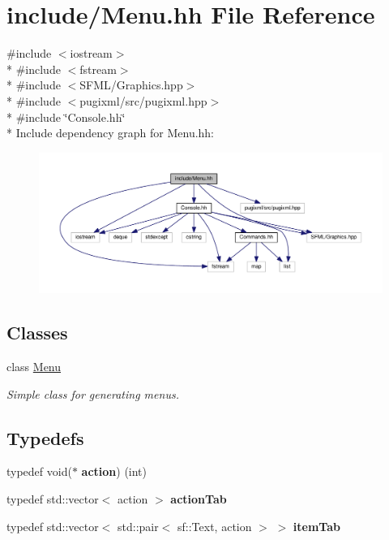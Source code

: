 \hypertarget{Menu_8hh}{}\section{include/\+Menu.hh File Reference}
\label{Menu_8hh}
{\ttfamily \#include $<$iostream$>$}\\*
{\ttfamily \#include $<$fstream$>$}\\*
{\ttfamily \#include $<$S\+F\+M\+L/\+Graphics.\+hpp$>$}\\*
{\ttfamily \#include $<$pugixml/src/pugixml.\+hpp$>$}\\*
{\ttfamily \#include \char`\"{}Console.\+hh\char`\"{}}\\*
Include dependency graph for Menu.\+hh\+:\nopagebreak
\begin{figure}[H]
\begin{center}
\leavevmode
\includegraphics[width=350pt]{Menu_8hh__incl}
\end{center}
\end{figure}
\subsection*{Classes}
\begin{DoxyCompactItemize}
\item 
class \hyperlink{classMenu}{Menu}
\begin{DoxyCompactList}\small\item\em Simple class for generating menus. \end{DoxyCompactList}\end{DoxyCompactItemize}
\subsection*{Typedefs}
\begin{DoxyCompactItemize}
\item 
typedef void($\ast$ {\bfseries action}) (int)\hypertarget{Menu_8hh_a4f775b3a8fbaa314c0fb4c544cee02c7}{}\label{Menu_8hh_a4f775b3a8fbaa314c0fb4c544cee02c7}

\item 
typedef std\+::vector$<$ action $>$ {\bfseries action\+Tab}\hypertarget{Menu_8hh_a9e57dbf4d759c228d5fc330e7c959951}{}\label{Menu_8hh_a9e57dbf4d759c228d5fc330e7c959951}

\item 
typedef std\+::vector$<$ std\+::pair$<$ sf\+::\+Text, action $>$ $>$ {\bfseries item\+Tab}\hypertarget{Menu_8hh_ad2512f152a40707d65c36050dc1bbd91}{}\label{Menu_8hh_ad2512f152a40707d65c36050dc1bbd91}

\end{DoxyCompactItemize}
